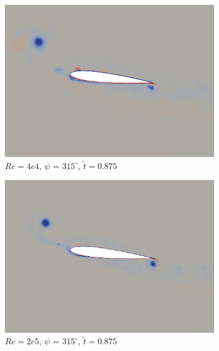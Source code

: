 \begin{figure}[H]
	\begin{subfigure}[b]{0.32\textwidth}
		\centering
		\includegraphics[width=1\textwidth]{figures/Vorticity_plots/Re_40k_1pt2/phase_315.png}
		\caption{$Re=4e4$, $\psi$ = $315^\circ$, $\tilde{t}=0.875$}
		\label{fig:Re_40k_1pt2_phi315}
	\end{subfigure}
	\begin{subfigure}[b]{0.32\textwidth}
		\centering
		\includegraphics[width=1\textwidth]{figures/Vorticity_plots/Re_200k_1pt2/phase_315.png}
		\caption{$Re=2e5$, $\psi$ = $315^\circ$, $\tilde{t}=0.875$}
		\label{fig:Re_200k_1pt2_phi315}
	\end{subfigure}
	\begin{subfigure}[b]{0.32\textwidth}
		\centering

\end{subfigure}
\end{figure}
